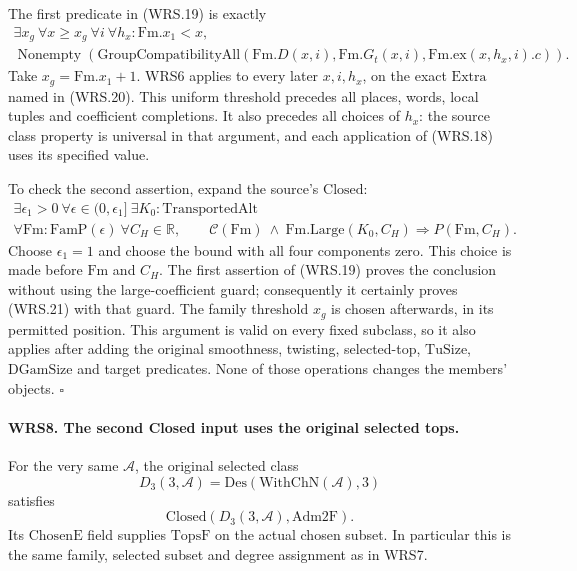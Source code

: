 \documentclass[11pt,a4paper]{article}
\numberwithin{equation}{section}
\theoremstyle{remark}\newtheorem{remark}[theorem]{Remark}
\begin{document}
The first predicate in (WRS.19) is exactly
\[
 \begin{gathered}
 \exists x_g\ \forall x\ge x_g\ \forall i\ \forall h_x:
          \mathrm{Fm}.x_1<x,\\
 \operatorname{Nonempty}\!\left(
 \mathrm{GroupCompatibilityAll}
       (\mathrm{Fm}.D(x,i),\mathrm{Fm}.G_t(x,i),
                       \mathrm{Fm}.\mathrm{ex}(x,h_x,i).c)\right).
 \end{gathered}
 \tag{WRS.20}
\]
Take \(x_g=\mathrm{Fm}.x_1+1\).  WRS6 applies to every later
\(x,i,h_x\), on the exact \(\mathrm{Extra}\) named in (WRS.20).
This uniform threshold precedes all places, words, local tuples
and coefficient completions.  It also precedes all choices of
\(h_x\): the source class property is universal in that argument,
and each application of (WRS.18) uses its specified value.

To check the second assertion, expand the source's \(\mathrm{Closed}\):
\[
 \begin{gathered}
 \exists\epsilon_1>0\ \forall\epsilon\in(0,\epsilon_1]\
 \exists K_0:\mathrm{TransportedAlt}\\
 \forall\mathrm{Fm}:\mathrm{FamP}(\epsilon)\ \forall C_H\in\mathbb R,
 \qquad \mathcal C(\mathrm{Fm})\ \land\
       \mathrm{Fm.Large}(K_0,C_H)\Longrightarrow P(\mathrm{Fm},C_H).
 \end{gathered}
 \tag{WRS.21}
\]
Choose \(\epsilon_1=1\) and choose the bound with all four
components zero.  This choice is made before \(\mathrm{Fm}\)
and \(C_H\).  The first assertion of (WRS.19) proves the
conclusion without using the large-coefficient guard; consequently
it certainly proves (WRS.21) with that guard.  The family threshold
\(x_g\) is chosen afterwards, in its permitted position.
This argument is valid on every fixed subclass, so it also applies
after adding the original smoothness, twisting, selected-top,
\(\mathrm{TuSize}\), \(\mathrm{DGamSize}\) and target predicates.
None of those operations changes the members' objects.
\hfill\(\square\)

\paragraph{WRS8. The second Closed input uses the original selected tops.}
\label{claim:WRS8}
For the very same \(\mathcal A\), the original selected class
\[
 D_3(3,\mathcal A)=\mathrm{Des}(\mathrm{WithChN}(\mathcal A),3)
 \tag{WRS.22}
\]
satisfies
\[
       \mathrm{Closed}(D_3(3,\mathcal A),\mathrm{Adm2F}).
 \tag{WRS.23}
\]
Its \(\mathrm{ChosenE}\) field supplies \(\mathrm{TopsF}\)
on the actual chosen subset.  In particular this is the same
family, selected subset and degree assignment as in WRS7.
\end{document}
